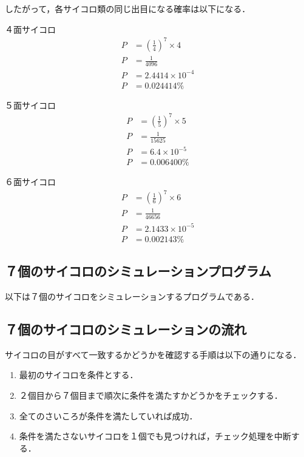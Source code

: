 \documentclass[a4j, titlepage]{jarticle}
\begin{document}
    したがって，各サイコロ類の同じ出目になる確率は以下になる．
    \begin{itembox}[l]{４面サイコロ}
      \begin{align}
        P &=  \left(\frac{1}{4}\right)^7 \times 4 \nonumber \\
        P &= \frac{1}{4096} \nonumber \\
        P &= 2.4414 \times 10^{-4} \nonumber\\
        P &= 0.024414\%
      \end{align}
    \end{itembox}
    \begin{itembox}[l]{５面サイコロ}
      \begin{align}
        P &=  \left(\frac{1}{5}\right)^7 \times 5 \nonumber \\
        P &= \frac{1}{15625} \nonumber \\
        P &= 6.4 \times 10^{-5} \nonumber\\
        P &= 0.006400 \% 
      \end{align}
    \end{itembox}
    \begin{itembox}[l]{６面サイコロ}
      \begin{align}
        P &=  \left(\frac{1}{6}\right)^7 \times 6 \nonumber \\
        P &= \frac{1}{46656} \nonumber \\
        P &= 2.1433 \times 10^{-5} \nonumber \\
        P &= 0.002143\%
      \end{align}
    \end{itembox}

  \subsection{７個のサイコロのシミュレーションプログラム}
    以下は７個のサイコロをシミュレーションするプログラムである．
     
  
  \subsection{７個のサイコロのシミュレーションの流れ}
    サイコロの目がすべて一致するかどうかを確認する手順は以下の通りになる．
    \begin{screen}
      \begin{enumerate}
        \item 最初のサイコロを条件とする．
        \item ２個目から７個目まで順次に条件を満たすかどうかをチェックする．
        \item 全てのさいころが条件を満たしていれば成功．
        \item 条件を満たさないサイコロを１個でも見つければ，チェック処理を中断する．
      \end{enumerate}
    \end{screen}
  
\end{document}
